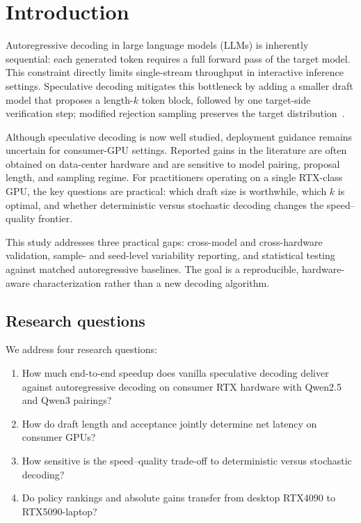 \section{Introduction}

Autoregressive decoding in large language models (LLMs) is inherently
sequential: each generated token requires a full forward pass of the target
model. This constraint directly limits single-stream throughput in interactive
inference settings. Speculative decoding mitigates this bottleneck by adding a
smaller draft model that proposes a length-$k$ token block, followed by one
target-side verification step; modified rejection sampling preserves the target
distribution~\cite{Leviathan2023, Chen2023specsampling}.

Although speculative decoding is now well studied, deployment guidance remains
uncertain for consumer-GPU settings. Reported gains in the literature are often
obtained on data-center hardware and are sensitive to model pairing, proposal
length, and sampling regime. For practitioners operating on a single RTX-class
GPU, the key questions are practical: which draft size is worthwhile, which
$k$ is optimal, and whether deterministic versus stochastic decoding changes
the speed--quality frontier.

This study addresses three practical gaps: cross-model and cross-hardware
validation, sample- and seed-level variability reporting, and statistical
testing against matched autoregressive baselines. The goal is a reproducible,
hardware-aware characterization rather than a new decoding algorithm.

\subsection{Research questions}
\label{sec:rqs}

We address four research questions:
\begin{enumerate}\itemsep0pt
  \item[\textbf{RQ1.}] How much end-to-end speedup does vanilla
        speculative decoding deliver against autoregressive decoding on
        consumer RTX hardware with Qwen2.5 and Qwen3 pairings?
  \item[\textbf{RQ2.}] How do draft length and acceptance jointly determine
        net latency on consumer GPUs?
  \item[\textbf{RQ3.}] How sensitive is the speed--quality trade-off to
        deterministic versus stochastic decoding?
  \item[\textbf{RQ4.}] Do policy rankings and absolute gains transfer from
        desktop RTX4090 to RTX5090-laptop?
\end{enumerate}

